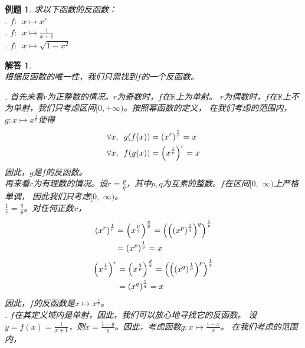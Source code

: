 \documentclass[12pt,UTF8]{ctexbook}
\newtheorem{et}{例题}[section]
\newtheorem*{so}{解答}
\begin{document}
\begin{et}\label{et:1-3-0}
    求以下函数的反函数：\\
    . $f:\,\,\,x \mapsto x^r$\\
    . $f:\,\,\,x \mapsto \frac{1}{x + 1}$\\
    . $f:\,\,\,x \mapsto \sqrt{1 - x^2}$
\end{et}
\begin{so}
    \mbox{} \\
    根据反函数的唯一性，我们只需找到$f$的一个反函数。

    . 首先来看$r$为正整数的情况。$r$为奇数时，$f$在$\mathbb{R}$上为单射。
    $r$为偶数时，$f$在$\mathbb{R}$上不为单射，我们只考虑区间$[0, +\infty)$。按照幂函数的定义，
    在我们考虑的范围内，$g: x\mapsto x^{\frac{1}{r}}$使得
    \begin{align}
        \forall x, \,\,\, g(f(x)) &= \left(x^r\right)^{\frac{1}{r}} = x \notag \\
        \forall x, \,\,\, f(g(x)) &= \left(x^{\frac{1}{r}}\right)^{r} = x \notag 
    \end{align} 
    因此，$g$是$f$的反函数。\\  
    再来看$r$为有理数的情况。设$r = \frac{p}{q}$，其中$p,q$为互素的整数。$f$在区间$[0,\,\,\infty)$上严格单调，
    因此我们只考虑$[0,\,\,\infty)$。\\
    $\frac{1}{r} = \frac{q}{p}$。对任何正数$x$，
    \begin{align}
        \left(x^r\right)^{\frac{1}{r}} &= \left(x^{\frac{p}{q}}\right)^{\frac{q}{p}} = \left(\left(\left(x^{p}\right)^\frac{1}{q}\right)^q\right)^\frac{1}{p} \notag \\
                                       &= \left(x^{p}\right)^\frac{1}{p} = x \notag
    \end{align}
    \begin{align}
        \left(x^{\frac{1}{r}}\right)^r &= \left(x^{\frac{q}{p}}\right)^{\frac{p}{q}} = \left(\left(\left(x^{q}\right)^\frac{1}{p}\right)^p\right)^\frac{1}{q} \notag \\
                                       &= \left(x^{q}\right)^\frac{1}{q} = x \notag
    \end{align}
    因此，$f$的反函数是$x\mapsto x^{\frac{1}{r}}$。\\
    . $f$在其定义域内是单射，因此，我们可以放心地寻找它的反函数。
    设$y = f(x) = \frac{1}{x+1}$，则$x = \frac{1 - y}{y}$。因此，考虑函数$g: x\mapsto \frac{1 - x}{x}$。
    在我们考虑的范围内，
    \begin{align}

\end{align}
\end{so}
\end{document}

